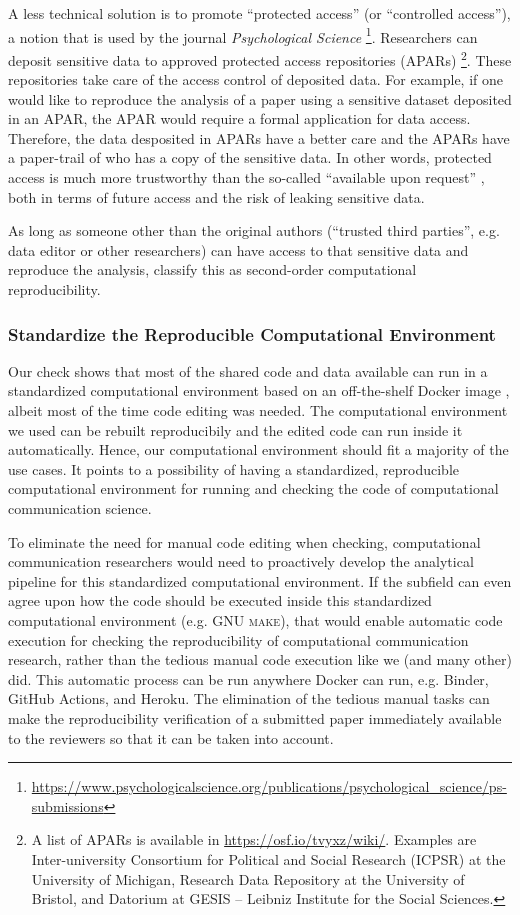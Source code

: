 A less technical solution is to promote ``protected access'' (or ``controlled access''), a notion that is used by the journal \textit{Psychological Science} \footnote{\url{https://www.psychologicalscience.org/publications/psychological_science/ps-submissions}}. Researchers can deposit sensitive data to approved protected access repositories (APARs) \footnote{A list of APARs is available in \url{https://osf.io/tvyxz/wiki/}. Examples are Inter-university Consortium for Political and Social Research (ICPSR) at the University of Michigan, Research Data Repository at the University of Bristol, and Datorium at GESIS – Leibniz Institute for the Social Sciences.}. These repositories take care of the access control of deposited data. For example, if one would like to reproduce the analysis of a paper using a sensitive dataset deposited in an APAR, the APAR would require a formal application for data access. Therefore, the data desposited in APARs have a better care and the APARs have a paper-trail of who has a copy of the sensitive data. In other words, protected access is much more trustworthy than the so-called ``available upon request'' \parencite[]{kr-arferwssm-12}, both in terms of future access and the risk of leaking sensitive data. 

As long as someone other than the original authors (``trusted third parties'', e.g. data editor or other researchers) can have access to that sensitive data and reproduce the analysis, \textcite{schoch:2023:CRC} classify this as second-order computational reproducibility.

\subsubsection{Standardize the Reproducible Computational Environment}
\label{subsubsec:compenviron}
Our check shows that most of the shared code and data available can run in a standardized computational environment based on an off-the-shelf Docker image \parencite[]{boettiger:2017:IR}, albeit most of the time code editing was needed. The computational environment we used can be rebuilt reproducibily and the edited code can run inside it automatically. Hence, our computational environment should fit a majority of the use cases. It points to a possibility of having a standardized, reproducible computational environment for running and checking the code of computational communication science. 

To eliminate the need for manual code editing when checking, computational communication researchers would need to proactively develop the analytical pipeline for this standardized computational environment. If the subfield can even agree upon how the code should be executed inside this standardized computational environment (e.g. \textsc{GNU make}), that would enable automatic code execution for checking the reproducibility of computational communication research, rather than the tedious manual code execution like we (and many other) did. This automatic process can be run anywhere Docker can run, e.g. Binder, GitHub Actions, and Heroku. The elimination of the tedious manual tasks can make the reproducibility verification of a submitted paper immediately available to the reviewers so that it can be taken into account.

